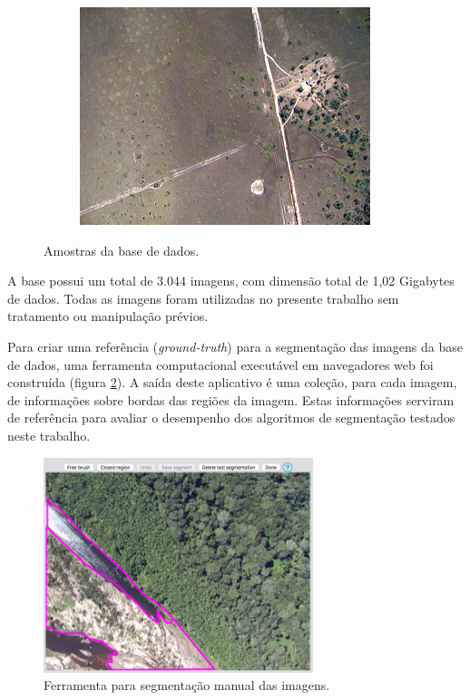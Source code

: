 \begin{figure}[h]
\begin{subfigure}[b]{0.3\textwidth}
    \includegraphics[width=\textwidth]{imgs/amostra3}
  \end{subfigure}%
  \caption{Amostras da base de dados.}
  \label{fig:amostra}
\end{figure}

A base possui um total de 3.044 imagens, com dimensão total de 1,02 Gigabytes de dados. Todas as imagens foram utilizadas no presente trabalho sem tratamento ou manipulação prévios.

Para criar uma referência (\textit{ground-truth}) para a segmentação das imagens da base de dados, uma ferramenta computacional executável em navegadores web foi construída (figura \ref{fig:manualseg}). A saída deste aplicativo é uma coleção, para cada imagem, de informações sobre bordas das regiões da imagem. Estas informações serviram de referência para avaliar o desempenho dos algoritmos de segmentação testados neste trabalho.

\begin{figure}[h]
  \centering
  \includegraphics[width=0.7\textwidth]{imgs/manualseg}
  \caption{Ferramenta para segmentação manual das imagens.}
  \label{fig:manualseg}
\end{figure}

